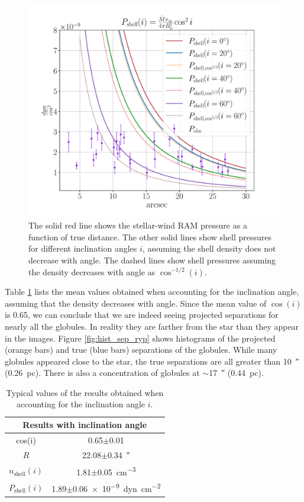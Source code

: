 \documentclass{book}
\begin{document}
\begin{figure}[htb]
    \centering
    \includegraphics[width=\textwidth]{imagenes_corregidas/S_2.pdf}
    \caption{The solid red line shows the stellar-wind RAM pressure as
      a function of true distance. The other solid lines show shell
      pressures for different inclination angles $i$, assuming the
      shell density does not decrease with angle. The dashed lines
      show shell pressures assuming the density decreases with angle
      as $\cos^{-1/2}(i)$.}
    \label{fig:ncos_2}
\end{figure}

Table \ref{tab:mean_i} lists the mean values obtained when accounting
for the inclination angle, assuming that the density decreases with
angle. Since the mean value of $\cos(i)$ is 0.65, we can conclude that
we are indeed seeing projected separations for nearly all the
globules. In reality they are farther from the star than they appear
in the images. Figure \ref{fig:hist_sep_ryp} shows histograms of the
projected (orange bars) and true (blue bars) separations of the
globules. While many globules appeared close to the star, the true
separations are all greater than \SI{10}{\arcsecond}
(\SI{0.26}{pc}). There is also a concentration of globules at
$\sim$\SI{17}{\arcsecond} (\SI{0.44}{pc}).

\begin{table}[htb]
    \centering
    \begin{tabular}{c c}
        \toprule
        \multicolumn{2}{c}{Results with inclination angle} \\ \midrule
         cos(i) & 0.65$\pm$0.01 \\
         $R$ & 22.08$\pm$\SI{0.34}{\arcsecond}\\
         $n_\mathrm{shell}(i)$ & 1.81$\pm$\SI{0.05}{cm^{-3}}\\
         $P_\mathrm{shell}(i)$ & 1.89$\pm$\SI{.06e-9}{dyn.cm^{-2}} \\
         \bottomrule
    \end{tabular}
    \caption{Typical values of the results obtained when accounting
      for the inclination angle $i$.}
    \label{tab:mean_i}
\end{table}
\end{document}
